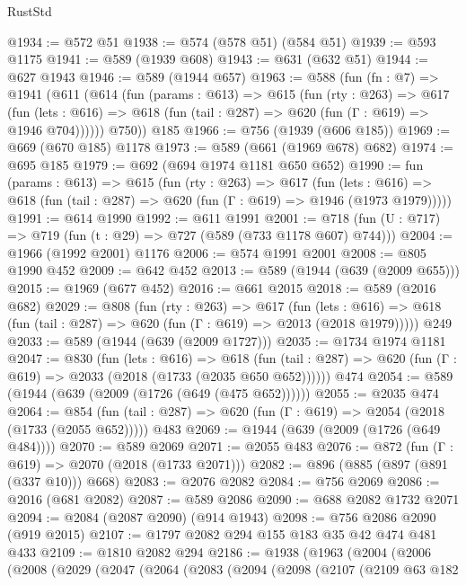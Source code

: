 \begin{lexlean}{RustStd}
\begin{coremodule}
{\begin{coremodule}
{{{{{{{{{@1934 := @572 @51
@1938 := @574 (@578 @51) (@584 @51)
@1939 := @593 @1175
@1941 := @589 (@1939 @608)
@1943 := @631 (@632 @51)
@1944 := @627 @1943
@1946 := @589 (@1944 @657)
@1963 := @588
    (fun (fn : @7) =>
    @1941
      (@611
        (@614
          (fun (params : @613) =>
          @615
            (fun (rty : @263) =>
            @617
              (fun (lets : @616) =>
              @618 (fun (tail : @287) => @620 (fun (Γ : @619) => @1946 @704))))))
        @750))
    @185
@1966 := @756 (@1939 (@606 @185))
@1969 := @669 (@670 @185) @1178
@1973 := @589 (@661 (@1969 @678) @682)
@1974 := @695 @185
@1979 := @692 (@694 @1974 @1181 @650 @652)
@1990 := fun (params : @613) =>
  @615
    (fun (rty : @263) =>
    @617
      (fun (lets : @616) =>
      @618 (fun (tail : @287) => @620 (fun (Γ : @619) => @1946 (@1973 @1979)))))
@1991 := @614 @1990
@1992 := @611 @1991
@2001 := @718 (fun (U : @717) => @719 (fun (t : @29) => @727 (@589 (@733 @1178 @607) @744)))
@2004 := @1966 (@1992 @2001) @1176
@2006 := @574 @1991 @2001
@2008 := @805 @1990 @452
@2009 := @642 @452
@2013 := @589 (@1944 (@639 (@2009 @655)))
@2015 := @1969 (@677 @452)
@2016 := @661 @2015
@2018 := @589 (@2016 @682)
@2029 := @808
    (fun (rty : @263) =>
    @617
      (fun (lets : @616) =>
      @618 (fun (tail : @287) => @620 (fun (Γ : @619) => @2013 (@2018 @1979)))))
    @249
@2033 := @589 (@1944 (@639 (@2009 @1727)))
@2035 := @1734 @1974 @1181
@2047 := @830
    (fun (lets : @616) =>
    @618 (fun (tail : @287) => @620 (fun (Γ : @619) => @2033 (@2018 (@1733 (@2035 @650 @652))))))
    @474
@2054 := @589 (@1944 (@639 (@2009 (@1726 (@649 (@475 @652))))))
@2055 := @2035 @474
@2064 := @854
    (fun (tail : @287) => @620 (fun (Γ : @619) => @2054 (@2018 (@1733 (@2055 @652)))))
    @483
@2069 := @1944 (@639 (@2009 (@1726 (@649 @484))))
@2070 := @589 @2069
@2071 := @2055 @483
@2076 := @872 (fun (Γ : @619) => @2070 (@2018 (@1733 @2071)))
@2082 := @896 (@885 (@897 (@891 (@337 @10))) @668)
@2083 := @2076 @2082
@2084 := @756 @2069
@2086 := @2016 (@681 @2082)
@2087 := @589 @2086
@2090 := @688 @2082 @1732 @2071
@2094 := @2084 (@2087 @2090) (@914 @1943)
@2098 := @756 @2086 @2090 (@919 @2015)
@2107 := @1797 @2082 @294 @155 @183 @35 @42 @474 @481 @433
@2109 := @1810 @2082 @294
@2186 := @1938
    (@1963
      (@2004
        (@2006
          (@2008
            (@2029
              (@2047
                (@2064
                  (@2083
                    (@2094
                      (@2098
                        (@2107
                          (@2109
                            @63
                            @182
}}}}}}}}}
\end{coremodule}}
\end{coremodule}
\end{lexlean}
